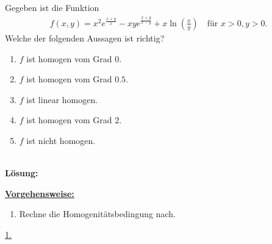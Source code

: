\subsection*{}
Gegeben ist die Funktion
\begin{align*}
	f(x,y) 
	=
	x^2 e^{\frac{x+y}{x}}
	-
	xy e^{\frac{x+y}{x-y}}
	+
	x \ln \left( \frac{x}{y} \right)
	\quad \textrm{für } x>0,y>0.
\end{align*}
Welche der folgenden Aussagen ist richtig?
\renewcommand{\labelenumi}{(\alph{enumi})}
\begin{enumerate}
	\item
	$ f  $ ist homogen vom Grad $ 0 $.
	\item
	$ f  $ ist homogen vom Grad $ 0.5 $.
	\item
	$ f $ ist linear homogen.	
	\item 
	$ f  $ ist homogen vom Grad $ 2 $.
	\item
	$ f $ ist nicht homogen.
\end{enumerate}
\ \\
\textbf{Lösung:}
\begin{mdframed}
\underline{\textbf{Vorgehensweise:}}
\renewcommand{\labelenumi}{\theenumi.}
\begin{enumerate}
\item Rechne die Homogenitätsbedingung nach.
\end{enumerate}
\end{mdframed}

\underline{1. }\\


\newpage

